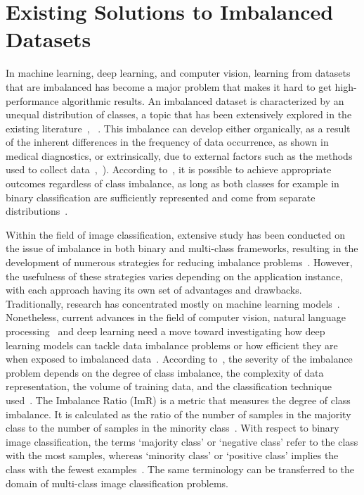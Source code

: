 \section{Existing Solutions to Imbalanced Datasets}
In machine learning, deep learning, and computer vision, learning from datasets that are imbalanced has become a major problem that makes it hard to get high-performance algorithmic results. An imbalanced dataset is characterized by an unequal distribution of classes, a topic that has been extensively explored in the existing literature~\citep{Fernndez2018LearningFI}, ~\citep{5128907Haibo_Imbalance}. This imbalance can develop either organically, as a result of the inherent differences in the frequency of data occurrence, as shown in medical diagnostics, or extrinsically, due to external factors such as the methods used to collect data~\citep{articleSurveyImData},~\citep{5128907Haibo_Imbalance}). According to~\citet{articleKrawczyk}, it is possible to achieve appropriate outcomes regardless of class imbalance, as long as both classes for example in binary classification are sufficiently represented and come from separate distributions~\citep{articleSurveyImData}.

Within the field of image classification, extensive study has been conducted on the issue of imbalance in both binary and multi-class frameworks, resulting in the development of numerous strategies for reducing imbalance problems~\citep{5128907Haibo_Imbalance,H_13_chawla2002smote,H_44_han2005borderline,H_45_he2008adasyn}. However, the usefulness of these strategies varies depending on the application instance, with each approach having its own set of advantages and drawbacks. Traditionally, research has concentrated mostly on machine learning models~\citep{H_75_akbani2004applying, H_77_vilarino2005experiments, H_78_kang2006eus, H_81_tang2006granular}. Nonetheless, current advances in the field of computer vision, natural language processing~\citep{NLP_chen2021multi} and deep learning need a move toward investigating how deep learning models can tackle data imbalance problems or how efficient they are when exposed to imbalanced data~\citep{articleSurveyImData}. According to~\citet{articleJapkowicz2systematicstudy}, the severity of the imbalance problem depends on the degree of class imbalance, the complexity of data representation, the volume of training data, and the classification technique used~\citep{AjayDBLP:journals/corr/abs-2108-00071}.
The Imbalance Ratio (ImR) is a metric that measures the degree of class imbalance. It is calculated as the ratio of the number of samples in the majority class to the number of samples in the minority class~\citep{Fernndez2018LearningFI}. With respect to binary image classification, the terms `majority class' or `negative class' refer to the class with the most samples, whereas `minority class' or `positive class' implies the class with the fewest examples~\citep{AjayDBLP:journals/corr/abs-2108-00071}. The same terminology can be transferred to the domain of multi-class image classification problems.

